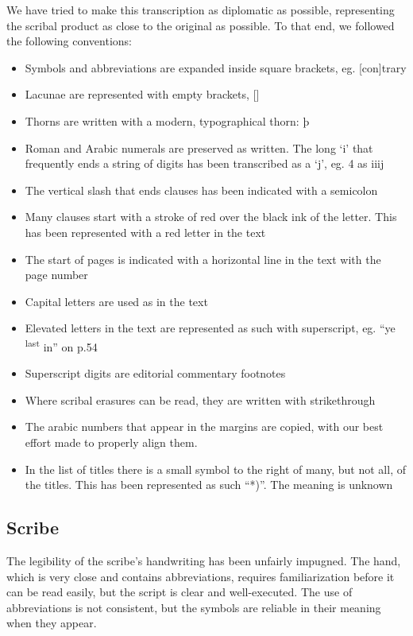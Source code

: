 \documentclass[12pt,letter]{article} %
\begin{document}
We have tried to make this transcription as diplomatic as possible, representing the scribal product as close to the original as possible.  To that end, we followed the following conventions:
\begin{itemize}
    \item Symbols and abbreviations are expanded inside square brackets, eg. [con]trary
    \item Lacunae are represented with empty brackets, []
    \item Thorns are written with a modern, typographical thorn: þ
    \item Roman and Arabic numerals are preserved as written.  The long ‘i’ that frequently ends a string of digits has been transcribed as a ‘j’, eg. 4 as iiij
    \item The vertical slash that ends clauses has been indicated with a semicolon
    \item Many clauses start with a stroke of red over the black ink of the letter.  This has been represented with a red letter in the text
    \item The start of pages is indicated with a horizontal line in the text with the page number
    \item Capital letters are used as in the text
    \item Elevated letters in the text are represented as such with superscript, eg. “ye \textsuperscript{last} in” on p.54
    \item Superscript digits are editorial commentary footnotes
    \item Where scribal erasures can be read, they are written with strikethrough
    \item The arabic numbers that appear in the margins are copied, with our best effort made to properly align them.
    \item In the list of titles there is a small symbol to the right of many, but not all, of the titles.  This has been represented as such “*)”.  The meaning is unknown
\end{itemize}

\subsection{Scribe}

The legibility of the scribe’s handwriting has been unfairly impugned. The hand, which is very close and contains abbreviations, requires familiarization before it can be read easily, but the script is clear and well-executed. The use of abbreviations is not consistent, but the symbols are reliable in their meaning when they appear.
\end{document}
